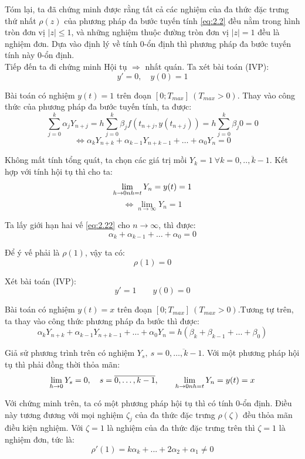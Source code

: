 Tóm lại, ta đã chứng minh được rằng tất cả các nghiệm của đa thức đặc trưng thứ nhất $\rho(z)$ của phương pháp đa bước tuyến tính \eqref{eq:2.2} đều nằm trong hình tròn đơn vị $|z| \le 1$, và những nghiệm thuộc đường tròn đơn vị $|z| = 1$ đều là nghiệm đơn. Dựa vào định lý về tính $0$-ổn định thì phương pháp đa bước tuyến tính này $0$-ổn định.\\


Tiếp đến ta đi chứng minh Hội tụ $\Longrightarrow$ nhất quán. Ta xét bài toán (IVP):
\[
y'=0, \quad y(0)=1 
\]

Bài toán có nghiệm $y(t) = 1$ trên đoạn $[0;T_{max}] \ (T_{max} >0)$. Thay vào công thức của phương pháp đa bước tuyến tính, ta được:
\[
\sum_{j=0}^{k} \alpha_j Y_{n+j} = h \sum_{j=0}^{k} \beta_j f(t_{n+j}, y(t_{n+j})) = h \sum_{j=0}^{k}\beta_j0=0
\]
\begin{equation}
    \Leftrightarrow \alpha_kY_{n+k} + \alpha_{k-1}Y_{n+k-1} + \dots + \alpha_{0}Y_{n} = 0 \tag{2.22} \label{eq:2.22}
\end{equation}

Không mất tính tổng quát, ta chọn các giá trị mồi $Y_k = 1 \ \forall k = \overline{0,..,k-1}$. Kết hợp với tính hội tụ thì cho ta:
\[
\lim_{h \to 0 \\ nh = t} Y_n = y(t) = 1
\]
\[
\Leftrightarrow \lim_{n \to \infty} Y_n = 1
\]

Ta lấy giới hạn hai vế \eqref{eq:2.22} cho $n \to \infty$, thì được:
\[
\alpha_{k} + \alpha_{k-1} + \dots + \alpha_{0} = 0 
\]

Để ý vế phải là $\rho(1)$, vậy ta có:
\begin{equation}
    \rho(1) = 0 \tag{2.23} \label{eq:2.23}
\end{equation}

Xét bài toán (IVP):
\[
y' = 1 \qquad y(0) = 0 
\]

Bài toán có nghiệm $y(t) = x$ trên đoạn $[0;T_{max}] \ (T_{max} >0)$.Tương tự trên, ta thay vào công thức phương pháp đa bước thì được:
\[
\alpha_{k}Y_{n+k} + \alpha_{k-1}Y_{n+k-1} + \dots + \alpha_{0}Y_{n} = h\left(\beta_{k}+\beta_{k-1}+ \dots + \beta_{0}\right)
\]

Giả sử phương trình trên có nghiệm $Y_s, \ s=\overline{0,\dots,k-1}$. Với một phương pháp hội tụ thì phải đồng thời thỏa mãn:
\[
\lim_{h \to 0} Y_s = 0, \quad s=\overline{0,\dots,k-1}, \qquad \lim_{h \to 0\\ nh = t}Y_n = y(t) = x
\]

Với chứng minh trên, ta có một phương pháp hội tụ thì có tính $0$-ổn định. Điều này tương đương với mọi nghiệm $\zeta_j$ của đa thức đặc trưng $\rho(\zeta)$ đều thỏa mãn điều kiện nghiệm. Với $\zeta = 1$ là nghiệm của đa thức đặc trưng trên thì $\zeta = 1$ là nghiệm đơn, tức là:
\[
\rho'(1) = k\alpha_{k} + ...+2\alpha_{2} + \alpha_{1} \ne 0
\]

